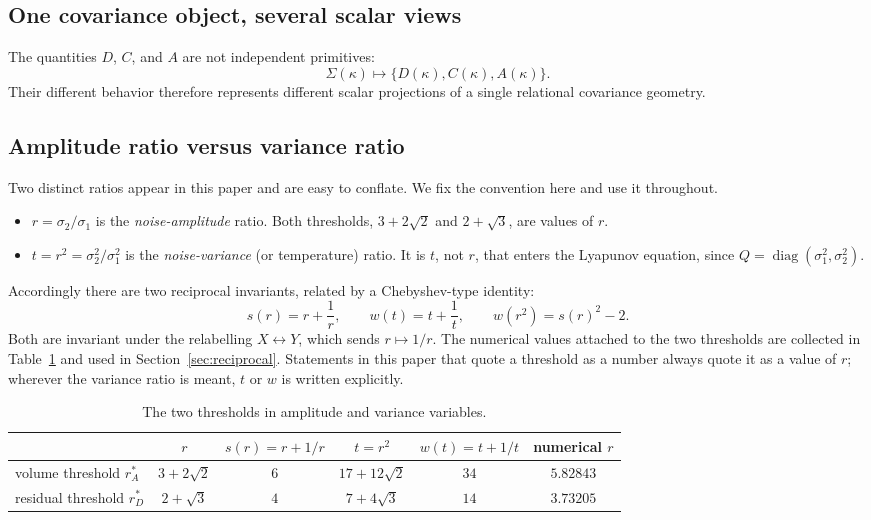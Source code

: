 \documentclass[11pt]{article}
\theoremstyle{plain}
\theoremstyle{remark}
\newcommand{\rA}{r_A^{*}}
\newcommand{\rD}{r_D^{*}}
\begin{document}
\subsection{One covariance object, several scalar views}

The quantities $D$, $C$, and $A$ are not independent primitives:
\[
  \Sigma(\kappa)\longmapsto\{D(\kappa),C(\kappa),A(\kappa)\}.
\]
Their different behavior therefore represents different scalar projections of a single
relational covariance geometry.

\subsection{Amplitude ratio versus variance ratio}\label{sec:ratios}

Two distinct ratios appear in this paper and are easy to conflate. We fix the convention here
and use it throughout.

\begin{itemize}\itemsep2pt
\item $r=\sigma_2/\sigma_1$ is the \emph{noise-amplitude} ratio. Both thresholds,
  $3+2\sqrt2$ and $2+\sqrt3$, are values of $r$.
\item $t=r^2=\sigma_2^2/\sigma_1^2$ is the \emph{noise-variance} (or temperature) ratio. It is
  $t$, not $r$, that enters the Lyapunov equation, since $Q=\operatorname{diag}(\sigma_1^2,\sigma_2^2)$.
\end{itemize}

Accordingly there are two reciprocal invariants, related by a Chebyshev-type identity:
\begin{equation}
  s(r)=r+\frac1r,
  \qquad
  w(t)=t+\frac1t,
  \qquad
  w(r^2)=s(r)^2-2. \label{eq:sw}
\end{equation}
Both are invariant under the relabelling $X\leftrightarrow Y$, which sends $r\mapsto1/r$. The
numerical values attached to the two thresholds are collected in Table~\ref{tab:invariants} and
used in Section~\ref{sec:reciprocal}. Statements in this paper that quote a threshold as a
number always quote it as a value of $r$; wherever the variance ratio is meant, $t$ or $w$ is
written explicitly.

\begin{table}[t]
\centering
\caption{The two thresholds in amplitude and variance variables.}
\label{tab:invariants}
\begin{tabular}{lccccc}
\toprule
 & $r$ & $s(r)=r+1/r$ & $t=r^2$ & $w(t)=t+1/t$ & numerical $r$\\
\midrule
volume threshold $\rA$   & $3+2\sqrt2$ & $6$ & $17+12\sqrt2$ & $34$ & $5.82843$\\
residual threshold $\rD$ & $2+\sqrt3$  & $4$ & $7+4\sqrt3$   & $14$ & $3.73205$\\
\bottomrule
\end{tabular}
\end{table}
\end{document}
